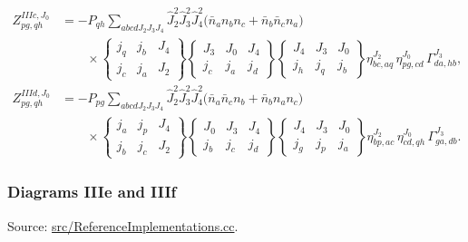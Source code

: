 \documentclass[
]{article}
\begin{document}
\begin{equation}
\begin{aligned}
Z^{IIIc,J_0}_{pg,qh}
&=-P_{qh}\sum_{abcdJ_2J_3J_4}
\hat J_2^2\hat J_3^2\hat J_4^2
\Big(\bar n_a n_b n_c+\bar n_b\bar n_c n_a\Big) \\
&\qquad\times
\begin{Bmatrix} j_q&j_b&J_4\\ j_c&j_a&J_2\end{Bmatrix}
\begin{Bmatrix} J_3&J_0&J_4\\ j_c&j_a&j_d\end{Bmatrix}
\begin{Bmatrix} J_4&J_3&J_0\\ j_h&j_q&j_b\end{Bmatrix}
\eta^{J_2}_{bc,aq}\,
\eta^{J_0}_{pg,cd}\,
\Gamma^{J_3}_{da,hb},\\
Z^{IIId,J_0}_{pg,qh}
&=-P_{pg}\sum_{abcdJ_2J_3J_4}
\hat J_2^2\hat J_3^2\hat J_4^2
\Big(\bar n_a\bar n_c n_b+\bar n_b n_a n_c\Big) \\
&\qquad\times
\begin{Bmatrix} j_a&j_p&J_4\\ j_b&j_c&J_2\end{Bmatrix}
\begin{Bmatrix} J_0&J_3&J_4\\ j_b&j_c&j_d\end{Bmatrix}
\begin{Bmatrix} J_4&J_3&J_0\\ j_g&j_p&j_a\end{Bmatrix}
\eta^{J_2}_{bp,ac}\,
\eta^{J_0}_{cd,qh}\,
\Gamma^{J_3}_{ga,db}.
\end{aligned}
\end{equation}

\subsubsection{Diagrams IIIe and IIIf}\label{diagrams-iiie-and-iiif}

Source:
\href{../src/ReferenceImplementations.cc\#L9873-L10299}{src/ReferenceImplementations.cc}.
\end{document}
